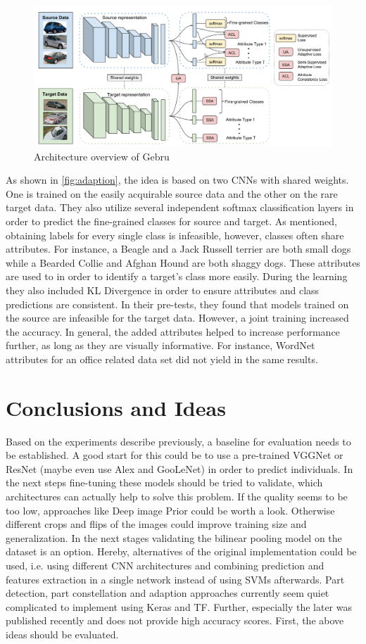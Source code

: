 \documentclass[electronic]{vgtc}             %
\begin{document}
	\begin{figure}[h]
		\includegraphics[width=.48\textwidth]{adaption}
		\caption{Architecture overview of Gebru\cite{Gebru:2017}}
		\label{fig:adaption}
	\end{figure}

	As shown in \autoref{fig:adaption}, the idea is based on two CNNs with shared weights.
	One is trained on the easily acquirable source data and the other on the rare target data. 
	They also utilize several independent softmax classification layers in order to predict the fine-grained classes for source and target.
	As mentioned, obtaining labels for every single class is infeasible, however, classes often share attributes. 
	For instance, a Beagle and a Jack Russell terrier are both small dogs while a Bearded Collie and Afghan Hound are both shaggy dogs.
	These attributes are used to in order to identify a target's class more easily.
	During the learning they also included KL Divergence in order to ensure attributes and class predictions are consistent. 
	In their pre-tests, they found that models trained on the source are infeasible for the target data.
	However, a joint training increased the accuracy. 
	In general, the added attributes helped to increase performance further, as long as they are visually informative. 
	For instance, WordNet attributes for an office related data set did not yield in the same results.
	
	\section{Conclusions and Ideas}
	
	Based on the experiments describe previously, a baseline for evaluation needs to be established. 
	A good start for this could be to use a pre-trained VGGNet or ResNet (maybe even use Alex and GooLeNet) in order to predict individuals. 
	In the next steps fine-tuning these models should be tried to validate, which architectures can actually help to solve this problem. 
	If the quality seems to be too low, approaches like Deep image Prior \cite{Ulyanov:2017} could be worth a look.
	Otherwise different crops and flips of the images could improve  training size and generalization.
	In the next stages validating the bilinear pooling model on the dataset is an option.
	Hereby, alternatives of the original implementation could be used, i.e. using different CNN architectures and combining prediction and features extraction in a single network instead of using SVMs afterwards.
	Part detection, part constellation and adaption approaches currently seem quiet complicated to implement using Keras and TF.
	Further, especially the later was published recently and does not provide high accuracy scores.
	First, the above ideas should be evaluated.
	
\end{document}
